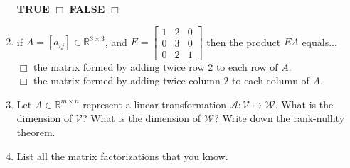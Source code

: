\documentclass[14pt]{report}
\begin{document}
\begin{enumerate}
\quad \textbf{TRUE} $\Box$ \quad\textbf{FALSE} $\Box$ 


\item if $A=[a_{ij}]\in\mathbb{R}^{3\times 3}$, and $E=\left[\begin{array}{ccc}
  1&2&0\\0&3&0\\0&2&1\end{array}\right]$ then the product $EA$ equals...\\

     $\Box$ the matrix formed by adding twice row 2 to each row of $A$.\\
     $\Box$ the matrix formed by adding twice column 2 to each column of $A$. 


\item Let $A\in\mathbb{R}^{m\times n}$ represent a linear transformation
  $\mathcal{A}:\mathcal{V}\mapsto \mathcal{W}$. What is the dimension of $\mathcal{V}$?
What is the dimension of $\mathcal{W}$? Write down the rank-nullity theorem.


\item List all the matrix factorizations that you know.


  \end{enumerate}
  
\end{document}
